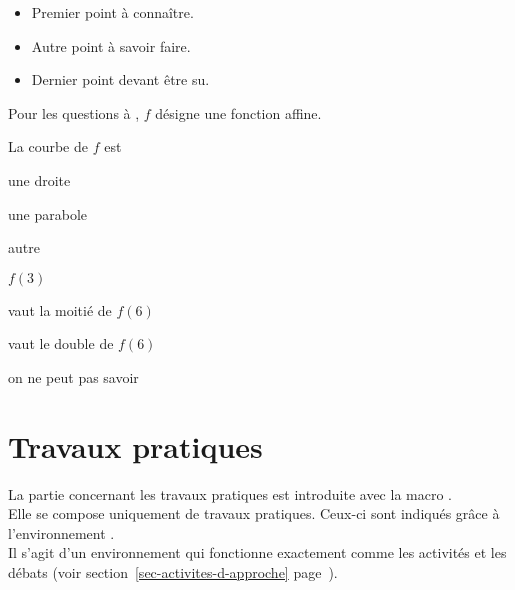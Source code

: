 \documentclass[nocrop]{sesamanuel}
\begin{document}
\begingroup
\connaissances
\begin{acquis}
  \begin{itemize}
  \item Premier point à connaître.
  \item Autre point à savoir faire.
  \item Dernier point devant être su.
  \end{itemize}
\end{acquis}
\begin{QCM}
  \begin{EnonceCommunQCM}
    Pour les questions  à
    , $f$ désigne une
    fonction affine.
  \end{EnonceCommunQCM}
  \begin{GroupeQCM}
    \begin{exercice}\label{premier-qcm}
      La courbe de $f$ est
      \begin{ChoixQCM}{3}
      \item une droite
      \item une parabole
      \item autre
      \end{ChoixQCM}
    \end{exercice}
    \begin{corrige}
    \end{corrige}
    \begin{exercice}\label{deuxieme-qcm}
      $f(3)$
      \begin{ChoixQCM}{3}
      \item vaut la moitié de $f(6)$
      \item vaut le double de $f(6)$
      \item on ne peut pas savoir
      \end{ChoixQCM}
    \end{exercice}
    \begin{corrige}
    \end{corrige}
  \end{GroupeQCM}
\end{QCM}
\endgroup

\newpage
\section{Travaux pratiques}
\label{sec-travaux-pratiques}
La partie concernant les travaux pratiques est introduite avec la
macro . \\Elle se compose uniquement de travaux
pratiques. Ceux-ci sont indiqués grâce à l'environnement
. \\Il s'agit d'un environnement qui fonctionne exactement
comme les activités et les débats (voir
section~\ref{sec-activites-d-approche}
page~\pageref{sec-activites-d-approche}).
\end{document}
